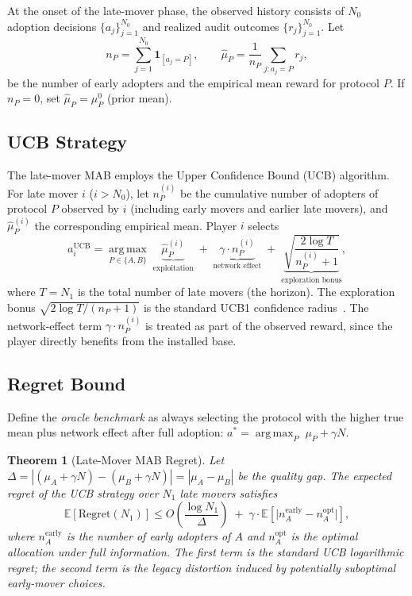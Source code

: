 \documentclass[12pt,a4paper]{article}
\newtheorem{theorem}{Theorem}[section]
\newcommand{\E}{\mathbb{E}}
\newcommand{\ind}[1]{\mathbf{1}_{[#1]}}
\newcommand{\argmax}{\operatorname*{arg\,max}}
\newcommand{\Regret}{\mathrm{Regret}}
\begin{document}
At the onset of the late-mover phase, the observed history consists of
$N_0$ adoption decisions $\{a_j\}_{j=1}^{N_0}$ and realized audit
outcomes $\{r_j\}_{j=1}^{N_0}$.  Let
\begin{equation}\label{eq:mab-suff}
    n_P = \sum_{j=1}^{N_0} \ind{a_j=P},\qquad
    \hat{\mu}_P = \frac{1}{n_P}\sum_{j:a_j=P} r_j,
\end{equation}
be the number of early adopters and the empirical mean reward for protocol
$P$.  If $n_P=0$, set $\hat{\mu}_P=\mu_P^0$ (prior mean).

\subsection{UCB Strategy}

The late-mover MAB employs the Upper Confidence Bound (UCB) algorithm.
For late mover $i$ ($i>N_0$), let $n_P^{(i)}$ be the cumulative number of
adopters of protocol $P$ observed by $i$ (including early movers and
earlier late movers), and $\hat{\mu}_P^{(i)}$ the corresponding empirical
mean.  Player $i$ selects
\begin{equation}\label{eq:ucb}
    a_i^{\text{UCB}} = \argmax_{P\in\{A,B\}}\;
    \underbrace{\hat{\mu}_P^{(i)}}_{\text{exploitation}}
    \;+\;
    \underbrace{\gamma\cdot n_P^{(i)}}_{\text{network effect}}
    \;+\;
    \underbrace{\sqrt{\frac{2\log T}{n_P^{(i)}+1}}}_{\text{exploration bonus}},
\end{equation}
where $T=N_1$ is the total number of late movers (the horizon).  The
exploration bonus $\sqrt{2\log T/(n_P+1)}$ is the standard UCB1
confidence radius~\citep{auer2002finite}.  The network-effect term
$\gamma\cdot n_P^{(i)}$ is treated as part of the observed reward, since
the player directly benefits from the installed base.

\subsection{Regret Bound}

Define the \emph{oracle benchmark} as always selecting the protocol with
the higher true mean plus network effect after full adoption:
$a^* = \argmax_P\; \mu_P + \gamma N$.

\begin{theorem}[Late-Mover MAB Regret]
\label{thm:regret}
Let $\Delta = |(\mu_A+\gamma N) - (\mu_B+\gamma N)| = |\mu_A-\mu_B|$ be the
quality gap.  The expected regret of the UCB strategy over $N_1$ late movers
satisfies
\begin{equation}\label{eq:regret-bound}
    \E[\Regret(N_1)] \leq
    O\!\left(\frac{\log N_1}{\Delta}\right)
    \;+\;
    \gamma\cdot\E\!\left[\big|n_A^{\text{early}} - n_A^{\text{opt}}\big|\right],
\end{equation}
where $n_A^{\text{early}}$ is the number of early adopters of $A$ and
$n_A^{\text{opt}}$ is the optimal allocation under full information.
The first term is the standard UCB logarithmic regret; the second term is
the \emph{legacy distortion} induced by potentially suboptimal early-mover
choices.
\end{theorem}
\end{document}
